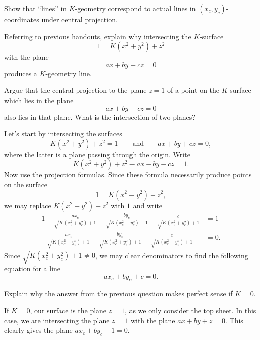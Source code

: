 \documentclass[newpage,hints,12pt,noauthor,handout,nooutcomes]{ximera}
\begin{document}
\begin{problem}
  Show that ``lines'' in $K$-geometry correspond to actual lines in
  $(x_{c},y_{c})$-coordinates under central projection.

\begin{hint}
  Referring to previous handouts, explain why intersecting the $K$-surface
  \[
  1 = K(x^2+y^2) + z^2 
  \]
  with the plane
  \[
  ax+by+cz = 0
  \]
  produces a $K$-geometry line.
\end{hint}

\begin{hint}
  Argue that the central projection to the plane $z=1$ of a point on the
  $K$-surface which lies in the plane
  $$ax+by+cz=0$$
  also lies in that plane.  What is the intersection of two planes?
\end{hint}

\begin{freeResponse}
  Let's start by intersecting the surfaces
  \[
  K(x^2+y^2)+z^2=1\qquad\text{and}\qquad ax+by+cz=0,
  \]
  where the latter is a plane passing through the origin. Write
  \[
  K(x^2+y^2)+z^2-ax-by-cz=1.
  \]
  Now use the projection formulas. Since these formula necessarily
  produce points on the surface
  \[
  1 = K\left(x^2+y^2\right) + z^2,
  \]
  we may replace $K\left(x^2+y^2\right) + z^2$ with $1$ and write
  \begin{align*}
    1-\frac{ax_c}{\sqrt{K\left(x_c^2 + y_c^2\right)+1}}- \frac{by_c}{\sqrt{K\left(x_c^2 + y_c^2\right)+1}}-\frac{c}{\sqrt{K\left(x_c^2 + y_c^2\right)+1}} &=1\\
    -\frac{ax_c}{\sqrt{K\left(x_c^2 + y_c^2\right)+1}}- \frac{by_c}{\sqrt{K\left(x_c^2 + y_c^2\right)+1}}-\frac{c}{\sqrt{K\left(x_c^2 + y_c^2\right)+1}} &=0.
  \end{align*}
  Since $\sqrt{K\left(x_c^2 + y_c^2\right)+1} \ne 0$, we may clear
  denominators to find the following equation for a line
  \[
  ax_c+by_c+c= 0.
  \]
\end{freeResponse}
\end{problem}

\begin{problem}
  Explain why the answer from the previous question makes perfect sense if $K=0$.
  \begin{freeResponse}
    If $K=0$, our surface is the plane $z=1$, as we only consider the
    top sheet. In this case, we are intersecting the plane $z=1$ with
    the plane $ax+by+z=0$. This clearly gives the plane $ax_c+ by_c +
    1 = 0.$
  \end{freeResponse}
\end{problem}
\end{document}
